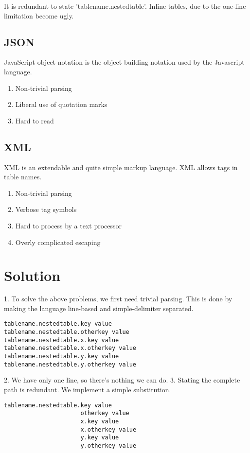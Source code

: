 \documentclass[listof=totoc]{article}
\begin{document}
It is redundant to state 'tablename.nestedtable'. Inline tables, due to the one-line limitation become ugly.

\subsection{JSON}
JavaScript object notation is the object building notation used by the Javascript language.
\begin{enumerate}
	\item Non-trivial parsing
	\item Liberal use of quotation marks
	\item Hard to read
\end{enumerate}

\subsection{XML}
XML is an extendable and quite simple markup language. XML allows tags in table names.
\begin{enumerate}
	\item Non-trivial parsing
	\item Verbose tag symbols
	\item Hard to process by a text processor
	\item Overly complicated escaping
\end{enumerate}

\section{Solution}
1. To solve the above problems, we first need trivial parsing. This is done by making the language line-based and simple-delimiter separated.

\begin{verbatim}
tablename.nestedtable.key value
tablename.nestedtable.otherkey value
tablename.nestedtable.x.key value
tablename.nestedtable.x.otherkey value
tablename.nestedtable.y.key value
tablename.nestedtable.y.otherkey value
\end{verbatim}

2. We have only one line, so there's nothing we can do.
3. Stating the complete path is redundant. We implement a simple substitution.

\begin{verbatim}
tablename.nestedtable.key value
                      otherkey value
                      x.key value
                      x.otherkey value
                      y.key value
                      y.otherkey value
\end{verbatim}
\end{document}
